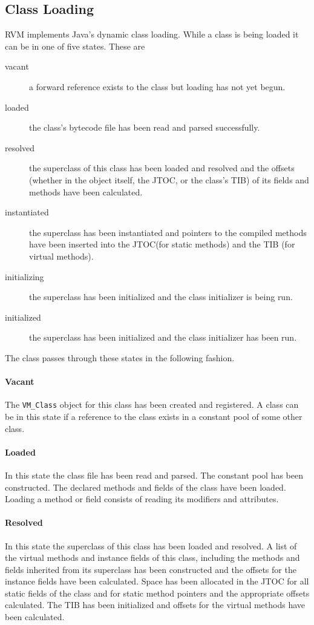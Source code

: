 \subsection{Class Loading} \label{sssec:classLoading}

RVM implements Java's dynamic class loading. While a class is being loaded it
can be in one of five states. These are
\begin{description}
\item[vacant] a forward reference exists to the class but loading has not yet 
begun.
\item[loaded] the class's bytecode file has been read and parsed successfully.
\item[resolved] the superclass of this class has been loaded and resolved and
the offsets (whether in the object itself, the JTOC, or the class's TIB) of its 
fields and methods have been calculated.
\item[instantiated] the superclass has been instantiated and pointers to the
compiled methods have been inserted into the JTOC(for static methods) and the
TIB (for virtual methods).
\item[initializing] the superclass has been initialized and the class
initializer is being run.
\item[initialized] the superclass has been initialized and the class
initializer has been run.
\end{description}

The class passes through these states in the following fashion.

\paragraph{Vacant}
The {\tt VM\_Class} object for this class has been created and registered. 
A class can be in this state if a reference to the class exists in a constant
pool of some other class.

\paragraph{Loaded} 
In this state the class file has been read and parsed.  The constant pool has 
been constructed. The declared methods and fields of the class have been loaded.
Loading a method or field consists of reading its modifiers and attributes.

\paragraph{Resolved}
In this state the superclass of this class has been loaded and resolved. 
A list of the virtual methods and instance fields of this class, including the 
methods and fields
inherited from its superclass has been constructed and the offsets for the 
instance fields have been calculated.  
Space has been allocated in the JTOC for all static fields of the class and for
static method pointers and the appropriate offsets calculated.
The TIB has been initialized and offsets for the virtual methods have been
calculated.

